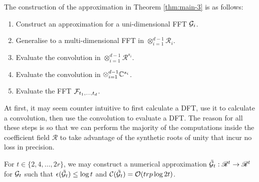 The construction of the approximation in Theorem \ref{thm:main-3} is as follows:
\begin{enumerate}
    \item Construct an approximation for a uni-dimensional FFT $\mathcal G_i$.
    \item Generalise to a multi-dimensional FFT in $\otimes_{i=1}^{d-1} \mathscr{R}_i$.
    \item Evaluate the convolution in $\otimes_{i=1}^{d-1} \mathscr{R}^{s_i}$.
    \item Evaluate the convolution in $\otimes_{i=1}^{d-1} {\mathbb C}^{s_i}$.
    \item Evaluate the FFT $\mathcal F_{t_1, \ldots, t_d}$.
\end{enumerate}

At first, it may seem counter intuitive to first calculate a DFT, use it to calculate a convolution, then use the convolution to evaluate a DFT. The reason for all these steps is so that we can perform the majority of the computations inside the coefficient field $\mathscr{R}$ to take advantage of the synthetic roots of unity that incur no loss in precision.

\begin{lemma}
    For $t \in \{2, 4, \ldots, 2r\}$, we may construct a numerical approximation $\tilde{\mathcal G}_t: \mathscr{R}^t \to \mathscr{R}^t$ for $\mathcal G_t$ such that $\epsilon (\tilde{\mathcal G}_t) \leq \log t$ and $\mathcal C(\tilde{\mathcal G}_t)= \mathcal O(trp \log 2t)$.
\end{lemma}

\medskip

